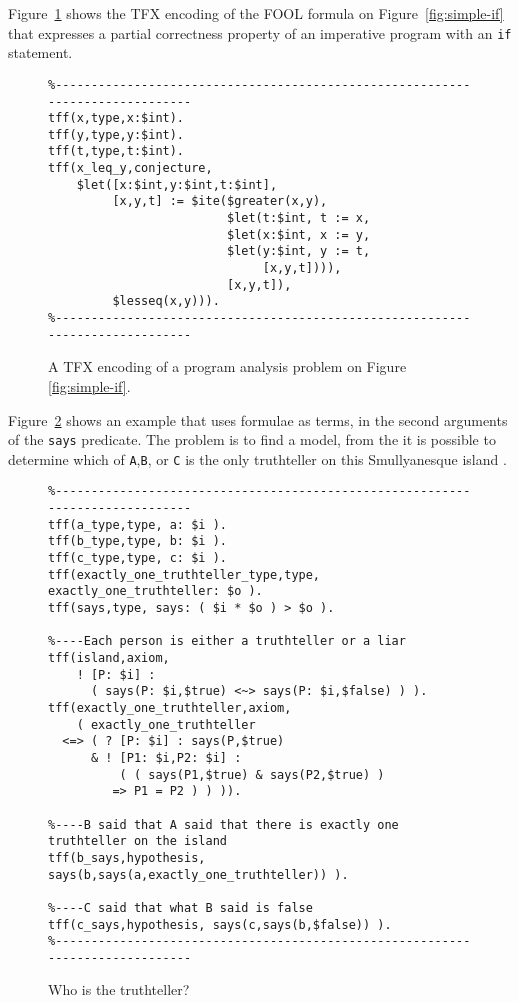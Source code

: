 \documentclass{easychair}
\begin{document}
Figure~\ref{LetITE} shows the TFX encoding of the FOOL formula on
Figure~\ref{fig:simple-if} that expresses a partial correctness property of an
imperative program with an \texttt{if} statement.

\begin{figure}[htbp]
\begin{small}
\begin{verbatim}
%------------------------------------------------------------------------------
tff(x,type,x:$int).
tff(y,type,y:$int).
tff(t,type,t:$int).
tff(x_leq_y,conjecture,
    $let([x:$int,y:$int,t:$int],
         [x,y,t] := $ite($greater(x,y),
                         $let(t:$int, t := x,
                         $let(x:$int, x := y,
                         $let(y:$int, y := t,
                              [x,y,t]))),
                         [x,y,t]),
         $lesseq(x,y))).
%------------------------------------------------------------------------------
\end{verbatim}
\end{small}
\caption{A TFX encoding of a program analysis problem on Figure
\ref{fig:simple-if}.}
\label{LetITE}
\end{figure}

Figure~\ref{Truthteller} shows an example that uses formulae as terms, in
the second arguments of the {\tt says} predicate.
The problem is to find a model, from the it is possible to determine which
of {\tt A},{\tt B}, or {\tt C} is the only truthteller on this
Smullyanesque island \cite{Smu78}.

\begin{figure}[htbp]
\begin{small}
\begin{verbatim}
%------------------------------------------------------------------------------
tff(a_type,type, a: $i ).
tff(b_type,type, b: $i ).
tff(c_type,type, c: $i ).
tff(exactly_one_truthteller_type,type, exactly_one_truthteller: $o ).
tff(says,type, says: ( $i * $o ) > $o ).

%----Each person is either a truthteller or a liar
tff(island,axiom,
    ! [P: $i] :
      ( says(P: $i,$true) <~> says(P: $i,$false) ) ).
tff(exactly_one_truthteller,axiom,
    ( exactly_one_truthteller
  <=> ( ? [P: $i] : says(P,$true)
      & ! [P1: $i,P2: $i] :
          ( ( says(P1,$true) & says(P2,$true) )
         => P1 = P2 ) ) )).

%----B said that A said that there is exactly one truthteller on the island
tff(b_says,hypothesis, says(b,says(a,exactly_one_truthteller)) ).

%----C said that what B said is false
tff(c_says,hypothesis, says(c,says(b,$false)) ).
%------------------------------------------------------------------------------
\end{verbatim}
\end{small}
\caption{Who is the truthteller?}
\label{Truthteller}
\end{figure}
\end{document}
